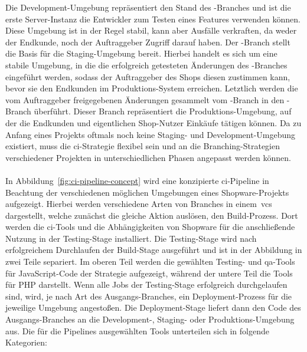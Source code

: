 Die Development-Umgebung repräsentiert den Stand des -Branches und ist die erste Server-Instanz
die Entwickler zum Testen eines Features verwenden können.
Diese Umgebung ist in der Regel stabil, kann aber Ausfälle verkraften, da weder der Endkunde, noch der Auftraggeber
Zugriff darauf haben.
Der -Branch stellt die Basis für die Staging-Umgebung bereit.
Hierbei handelt es sich um eine stabile Umgebung, in die die erfolgreich getesteten Änderungen des
-Branches eingeführt werden, sodass der Auftraggeber des Shops diesen zustimmen kann, bevor
sie den Endkunden im Produktions-System erreichen.
Letztlich werden die vom Auftraggeber freigegebenen Änderungen gesammelt vom -Branch in den
-Branch überführt.
Dieser Branch repräsentiert die Produktions-Umgebung, auf der die Endkunden und eigentlichen Shop-Nutzer Einkäufe
tätigen können.
Da zu Anfang eines Projekts oftmals noch keine Staging- und Development-Umgebung existiert, muss die
\acrshort{ci}-Strategie flexibel sein und an die Branching-Strategien verschiedener Projekten in unterschiedlichen
Phasen angepasst werden können.
\\\\
In Abbildung\ \ref{fig:ci-pipeline-concept} wird eine konzipierte \acrshort{ci}-Pipeline in Beachtung der verschiedenen
möglichen Umgebungen eines Shopware-Projekts aufgezeigt.
Hierbei werden verschiedene Arten von Branches in einem\ \acrshort{vcs} dargestellt, welche zunächst die gleiche Aktion
auslösen, den Build-Prozess.
Dort werden die \acrshort{ci}-Tools und die Abhängigkeiten von Shopware für die anschließende Nutzung in der
Testing-Stage installiert.
Die Testing-Stage wird nach erfolgreichem Durchlaufen der Build-Stage ausgeführt und ist in der Abbildung in zwei
Teile separiert.
Im oberen Teil werden die gewählten Testing- und \acrshort{qa}-Tools für JavaScript-Code der Strategie aufgezeigt,
während der untere Teil die Tools für PHP darstellt.
Wenn alle Jobs der Testing-Stage erfolgreich durchgelaufen sind, wird, je nach Art des Ausgangs-Branches, ein
Deployment-Prozess für die jeweilige Umgebung angestoßen.
Die Deployment-Stage liefert dann den Code des Ausgangs-Branches an die Development-, Staging- oder
Produktions-Umgebung aus.
Die für die Pipelines ausgewählten Tools unterteilen sich in folgende Kategorien:
\\\\
\noindent
